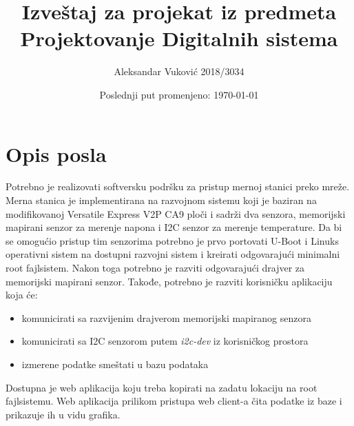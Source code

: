 \documentclass{article}
\title{Izveštaj za projekat iz predmeta \\ Projektovanje Digitalnih sistema} %
\author{Aleksandar Vuković 2018/3034}%
\date{Poslednji put promenjeno: \today} %
\begin{document}
\maketitle %








\section{Opis posla}


Potrebno je realizovati softversku podršku za pristup mernoj stanici preko mreže. Merna stanica je implementirana na razvojnom sistemu koji je baziran na modifikovanoj Versatile Express V2P CA9 ploči i sadrži dva senzora, memorijski mapirani senzor za merenje napona i I2C senzor za merenje temperature. Da bi se omogućio pristup tim senzorima potrebno je prvo portovati U-Boot i Linuks operativni sistem na dostupni razvojni sistem i kreirati odgovarajući minimalni root fajlsistem. Nakon toga potrebno je razviti odgovarajući drajver za memorijski mapirani senzor. Takođe, potrebno je razviti korisničku aplikaciju koja će:


\begin{itemize}
  \item komunicirati sa razvijenim drajverom memorijski mapiranog senzora
  \item komunicirati sa I2C senzorom putem \textit{i2c-dev} iz korisničkog prostora
  \item izmerene podatke smeštati u bazu podataka \\
\end{itemize}


Dostupna je web aplikacija koju treba kopirati na zadatu lokaciju na root fajlsistemu. Web aplikacija prilikom pristupa web client-a čita podatke iz baze i prikazuje ih u vidu grafika. 
\end{document}
